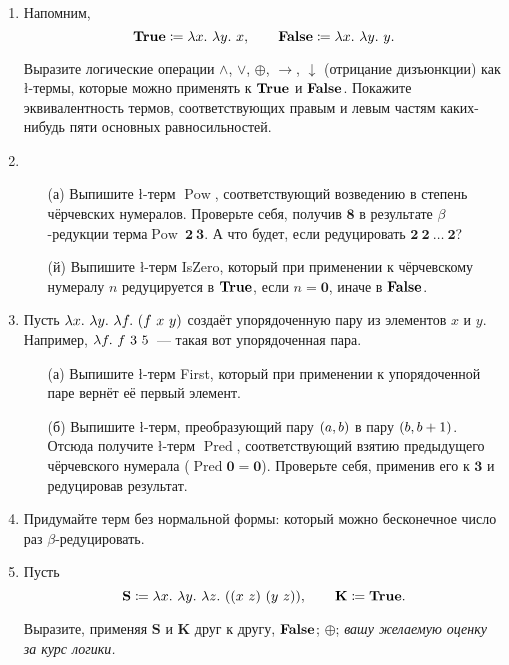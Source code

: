 \documentclass[a4paper,11pt]{article}
\DeclareMathOperator{\Pow}{Pow}
\DeclareMathOperator{\Pred}{Pred}
\begin{document}
\begin{enumerate}
	\item Напомним, \[\ltrue \coloneqq \l x.\ \l y.\ x,\qquad
	                 \lfalse \coloneqq \l x.\ \l y.\ y.\]

	Выразите логические операции \(\land\), \(\lor\), \(\oplus\), \(\rightarrow\), \(\downarrow\) (отрицание дизъюнкции) как \l -термы, которые можно применять к \(\ltrue\) и \(\lfalse\). Покажите эквивалентность термов, соответствующих правым и левым частям каких-нибудь пяти основных равносильностей.

	\item \begin{enumerate}
	   \item[(а)] Выпишите \l -терм \(\Pow\), соответствующий возведению в степень чёрчевских нумералов. Проверьте себя, получив \(\mathbf{8}\) в результате \(\beta\)-редукции терма\linebreak \(\Pow\ \mathbf{2}\ \mathbf{3}\). А что будет, если редуцировать \(\mathbf{2}\ \mathbf{2}\ \ldots\ \mathbf{2}\)?
	   \item[(й)] Выпишите \l -терм IsZero, который при применении к чёрчевскому нумералу \(n\) редуцируется в \(\ltrue\), если \(n = \mathbf{0}\), иначе в \(\lfalse\).
	\end{enumerate}
	   
\item Пусть \(\l x.\ \l y.\ \l f.\ \lr*{f\ x\ y}\) создаёт упорядоченную пару из элементов \(x\) и \(y\). Например, \(\l f.\ f\ 3\ 5\)~— такая вот упорядоченная пара. \begin{enumerate}
	\item[(а)] Выпишите \l -терм First, который при применении к упорядоченной паре вернёт её первый элемент.
	\item[(б)] Выпишите \l -терм, преобразующий пару \(\lr*{a,b}\) в пару \(\lr*{b,b+1}\). Отсюда получите \l -терм \(\Pred\), соответствующий взятию предыдущего чёрчевского нумерала (\(\Pred \mathbf{0} = \mathbf{0}\)). Проверьте себя, применив его к \(\mathbf{3}\) и редуцировав результат.
	\end{enumerate}

	\item Придумайте терм без нормальной формы: который можно бесконечное число раз \(\beta\)-редуцировать.

	\item Пусть \[\mathbf{S} \coloneqq \l x.\ \l y.\ \l z.\ \lr*{\lr*{x\ z}\ \lr*{y\ z}},\qquad
	              \mathbf{K} \coloneqq \ltrue.\]

Выразите, применяя \(\mathbf{S}\) и \(\mathbf{K}\) друг к другу, \(\lfalse\); \(\oplus\); {\it вашу желаемую оценку за курс логики.}
	
\end{enumerate}
\end{document}
